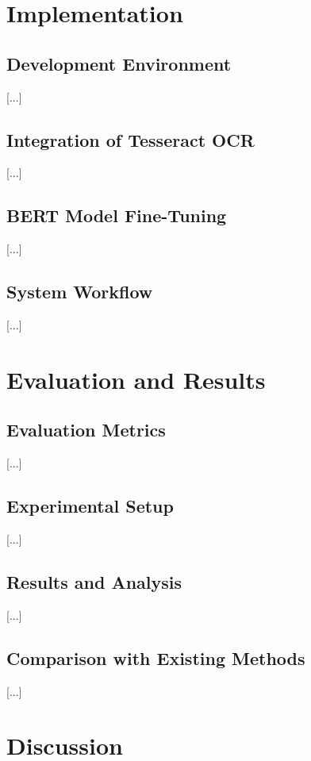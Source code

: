 \documentclass{SGGW-thesis-EN}
\begin{document}
\chapter{Implementation}

\section{Development Environment}
[...]

\section{Integration of Tesseract OCR}
[...]

\section{BERT Model Fine-Tuning}
[...]

\section{System Workflow}
[...]

\chapter{Evaluation and Results}

\section{Evaluation Metrics}
[...]

\section{Experimental Setup}
[...]

\section{Results and Analysis}
[...]

\section{Comparison with Existing Methods}
[...]

\chapter{Discussion}
\end{document}
